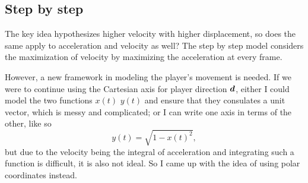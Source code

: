 \subsection{Step by step}
The key idea hypothesizes higher velocity with higher displacement, so does the same apply to acceleration and velocity as well? The step by step model considers the maximization of velocity by maximizing the acceleration at every frame.

However, a new framework in modeling the player's movement is needed. If we were to continue using the Cartesian axis for player direction $\boldsymbol{d}$, either I could model the two functions $x(t)$ $y(t)$ and ensure that they consulates a unit vector, which is messy and complicated; or I can write one axis in terms of the other, like so
\[
    y(t) = \sqrt{1-x(t)^2},
\]
but due to the velocity being the integral of acceleration and integrating such a function is difficult, it is also not ideal. So I came up with the idea of using polar coordinates instead.



